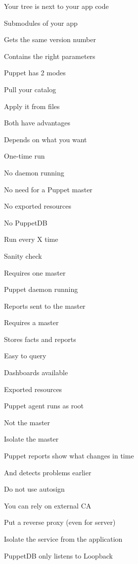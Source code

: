 \begin{iframe}
\item Your tree is next to your app code
\item Submodules of your app
\item Gets the same version number
\item Contains the right parameters
\end{iframe}


\begin{iframe}
\item Puppet has 2 modes
\item Pull your catalog
\item Apply it from files
\item Both have advantages
\item Depends on what you want
\end{iframe}
\begin{iframe}[Masterless]
\item One-time run
\item No daemon running
\item No need for a Puppet master
\item No exported resources
\item No PuppetDB
\end{iframe}
\begin{iframe}
\item Run every X time
\item Sanity check
\item Requires one master
\item Puppet daemon running
\item Reports sent to the master
\end{iframe}
\begin{iframe}[PuppetDB]
\item Requires a master
\item Stores facts and reports
\item Easy to query
\item Dashboards available
\item Exported resources
\end{iframe}
\begin{iframe}[Security]
\item Puppet agent runs as root
\item Not the master
\item Isolate the master
\item Puppet reports show what changes in time
\item And detects problems earlier
\end{iframe}
\begin{iframe}
\item Do not use autosign
\item You can rely on external CA
\item Put a reverse proxy (even for server)
\item Isolate the service from the application
\item PuppetDB only listens to Loopback
\end{iframe}

